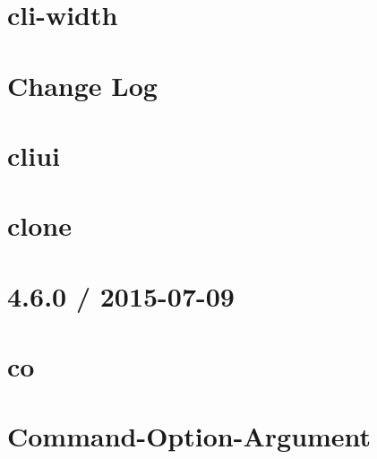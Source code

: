 \documentclass[twoside]{book}
\newcommand{\+}{\discretionary{\mbox{\scriptsize$\hookleftarrow$}}{}{}}
\begin{document}
\chapter{cli-\/width}
\label{md__c_1_workspace_demo_src_main_script_node_modules_cli-width__r_e_a_d_m_e}

\chapter{Change Log}
\label{md__c_1_workspace_demo_src_main_script_node_modules_cliui__c_h_a_n_g_e_l_o_g}

\chapter{cliui}
\label{md__c_1_workspace_demo_src_main_script_node_modules_cliui__r_e_a_d_m_e}

\chapter{clone}
\label{md__c_1_workspace_demo_src_main_script_node_modules_clone__r_e_a_d_m_e}

\chapter{4.6.0 / 2015-\/07-\/09}
\label{md__c_1_workspace_demo_src_main_script_node_modules_co__history}

\chapter{co}
\label{md__c_1_workspace_demo_src_main_script_node_modules_co__readme}

\chapter{Command-\/\+Option-\/\+Argument}
\label{md__c_1_workspace_demo_src_main_script_node_modules_coa__r_e_a_d_m_e}

\end{document}
